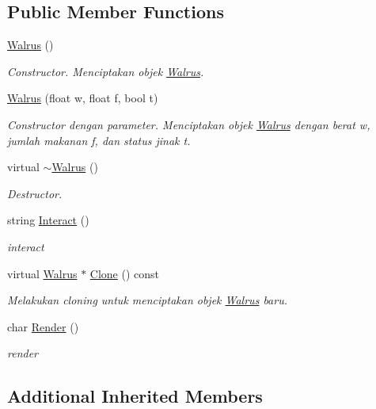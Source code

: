 \subsection*{Public Member Functions}
\begin{DoxyCompactItemize}
\item 
\hyperlink{classWalrus_a75c3d200b57a5c9fbcef9d8dc8247bf3}{Walrus} ()
\begin{DoxyCompactList}\small\item\em Constructor. Menciptakan objek \hyperlink{classWalrus}{Walrus}. \end{DoxyCompactList}\item 
\hyperlink{classWalrus_ad275ac9ac07871be362da7a4e180e68d}{Walrus} (float w, float f, bool t)
\begin{DoxyCompactList}\small\item\em Constructor dengan parameter. Menciptakan objek \hyperlink{classWalrus}{Walrus} dengan berat w, jumlah makanan f, dan status jinak t. \end{DoxyCompactList}\item 
virtual \hyperlink{classWalrus_a0dbf8812cdde2fecc53bee6823ff0119}{$\sim$\+Walrus} ()
\begin{DoxyCompactList}\small\item\em Destructor. \end{DoxyCompactList}\item 
string \hyperlink{classWalrus_aa21a90ecf8aff97c4cf90a59449ce02c}{Interact} ()
\begin{DoxyCompactList}\small\item\em interact \end{DoxyCompactList}\item 
virtual \hyperlink{classWalrus}{Walrus} $\ast$ \hyperlink{classWalrus_a9644eb3d51eb945b716bd37e25c7470e}{Clone} () const 
\begin{DoxyCompactList}\small\item\em Melakukan cloning untuk menciptakan objek \hyperlink{classWalrus}{Walrus} baru. \end{DoxyCompactList}\item 
char \hyperlink{classWalrus_a143f948e4c45e13a67f893caa435475d}{Render} ()
\begin{DoxyCompactList}\small\item\em render \end{DoxyCompactList}\end{DoxyCompactItemize}
\subsection*{Additional Inherited Members}


